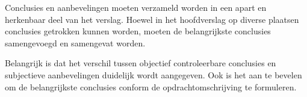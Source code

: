 
Conclusies en aanbevelingen moeten verzameld worden in een apart en
herkenbaar deel van het verslag. Hoewel in het hoofdverslag op diverse
plaatsen conclusies getrokken kunnen worden, moeten de belangrijkste
conclusies samengevoegd en samengevat worden. 


Belangrijk is dat het verschil tussen objectief controleerbare
conclusies en subjectieve aanbevelingen duidelijk wordt aangegeven.
Ook is het aan te bevelen om de belangrijkste conclusies conform de
opdrachtomschrijving te formuleren.

